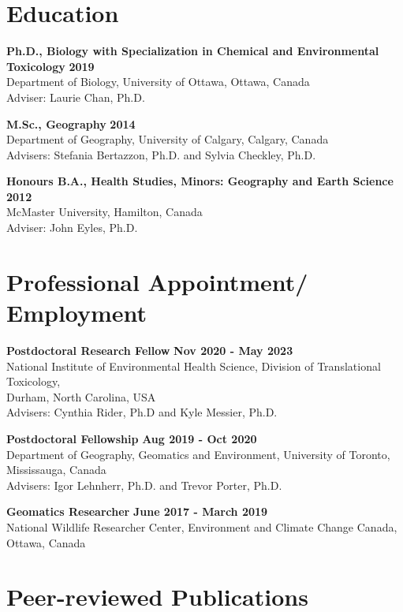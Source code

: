 \documentclass[margin,line]{res}
\begin{document}
\begin{resume}
\section{\sc Education}

\textbf{Ph.D., Biology with Specialization in Chemical and Environmental Toxicology} \hfill {\bf 2019}\\
Department of Biology, University of Ottawa, Ottawa, Canada \\
Adviser: Laurie Chan, Ph.D.

\textbf{M.Sc., Geography}  \hfill {\bf 2014}\\
Department of Geography, University of Calgary, Calgary, Canada\\
Advisers:  Stefania Bertazzon, Ph.D. and Sylvia Checkley, Ph.D.

\textbf{Honours B.A., Health Studies, Minors: Geography and Earth Science }\hfill {\bf 2012}\\
McMaster University, Hamilton, Canada\\
Adviser: John Eyles, Ph.D.

\vspace*{.1in}
\section{\sc Professional Appointment/ Employment}

{\bf  Postdoctoral Research Fellow} \hfill {\bf Nov 2020 - May 2023}\\
National Institute of Environmental Health Science, Division of Translational Toxicology,\\
Durham, North Carolina, USA\\
Advisers: Cynthia Rider, Ph.D and Kyle Messier, Ph.D.

{\bf Postdoctoral Fellowship} \hfill {\bf Aug 2019 - Oct 2020}\\
Department of Geography, Geomatics and Environment, University of Toronto, Mississauga, Canada\\
Advisers: Igor Lehnherr, Ph.D. and Trevor Porter, Ph.D.

{\bf Geomatics Researcher} \hfill {\bf June 2017 - March 2019}\\
National Wildlife Researcher Center, Environment and Climate Change Canada, Ottawa, Canada
\vspace*{.1in}

\section{\sc Peer-reviewed Publications}


\end{resume}
\end{document}
